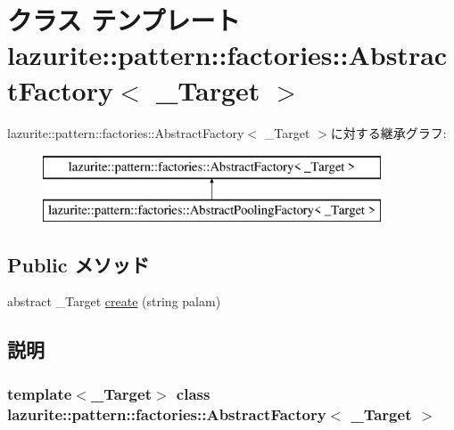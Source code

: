 \hypertarget{classlazurite_1_1pattern_1_1factories_1_1_abstract_factory_3_01___target_01_4}{
\section{クラス テンプレート lazurite::pattern::factories::AbstractFactory$<$ \_\-Target $>$}
\label{classlazurite_1_1pattern_1_1factories_1_1_abstract_factory_3_01___target_01_4}
}
lazurite::pattern::factories::AbstractFactory$<$ \_\-Target $>$に対する継承グラフ:\begin{figure}[H]
\begin{center}
\leavevmode
\includegraphics[height=2cm]{classlazurite_1_1pattern_1_1factories_1_1_abstract_factory_3_01___target_01_4}
\end{center}
\end{figure}
\subsection*{Public メソッド}
\begin{DoxyCompactItemize}
\item 
abstract \_\-Target \hyperlink{classlazurite_1_1pattern_1_1factories_1_1_abstract_factory_3_01___target_01_4_ae63884fb3ce2751090e0b40e761a043b}{create} (string palam)
\end{DoxyCompactItemize}


\subsection{説明}
\subsubsection*{template$<$\_\-Target$>$ class lazurite::pattern::factories::AbstractFactory$<$ \_\-Target $>$}



